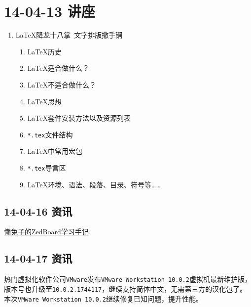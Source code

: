 \documentclass[]{report}
\begin{document}
\section{14-04-13 讲座}
\begin{enumerate}
	\item \LaTeX 降龙十八掌\ 文字排版撒手锏
	\begin{enumerate}
		\item \LaTeX 历史
		\item \LaTeX 适合做什么？
		\item \LaTeX 不适合做什么？
		\item \LaTeX 思想
		\item \LaTeX 套件安装方法以及资源列表
		\item \verb|*.tex|文件结构
		\item \LaTeX 中常用宏包
		\item \verb|*.tex|导言区
		\item \LaTeX 环境、语法、段落、目录、符号等……
	\end{enumerate}
\end{enumerate}
	\subsection{14-04-16 资讯}
		\href{http://www.openhw.org/bbs/article_1237_523288.html}{懒兔子的ZedBoard学习手记}
	\subsection{14-04-17 资讯}
		热门虚拟化软件公司\verb|VMware|发布\verb|VMware Workstation 10.0.2|虚拟机最新维护版，版本号也升级至\verb|10.0.2.1744117|，继续支持简体中文，无需第三方的汉化包了。本次\verb|VMware Workstation 10.0.2|继续修复已知问题，提升性能。
\end{document}
